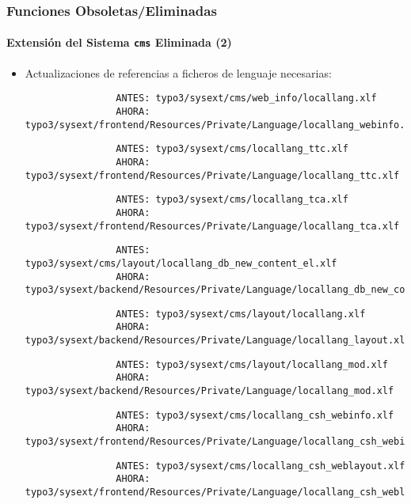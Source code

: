 \begin{frame}[fragile]
	\frametitle{Funciones Obsoletas/Eliminadas}
	\framesubtitle{Extensión del Sistema \texttt{cms} Eliminada (2)}

	\lstset{basicstyle=\tiny\ttfamily}

	\begin{itemize}

		\item Actualizaciones de referencias a ficheros de lenguaje necesarias:


			\begin{lstlisting}
				ANTES: typo3/sysext/cms/web_info/locallang.xlf
				AHORA: typo3/sysext/frontend/Resources/Private/Language/locallang_webinfo.xlf
			\end{lstlisting}
			\vspace{-0.3cm}
			\begin{lstlisting}
				ANTES: typo3/sysext/cms/locallang_ttc.xlf
				AHORA: typo3/sysext/frontend/Resources/Private/Language/locallang_ttc.xlf
			\end{lstlisting}
			\vspace{-0.3cm}
			\begin{lstlisting}
				ANTES: typo3/sysext/cms/locallang_tca.xlf
				AHORA: typo3/sysext/frontend/Resources/Private/Language/locallang_tca.xlf
			\end{lstlisting}
			\vspace{-0.3cm}
			\begin{lstlisting}
				ANTES: typo3/sysext/cms/layout/locallang_db_new_content_el.xlf
				AHORA: typo3/sysext/backend/Resources/Private/Language/locallang_db_new_content_el.xlf
			\end{lstlisting}
			\vspace{-0.3cm}
			\begin{lstlisting}
				ANTES: typo3/sysext/cms/layout/locallang.xlf
				AHORA: typo3/sysext/backend/Resources/Private/Language/locallang_layout.xlf
			\end{lstlisting}
			\vspace{-0.3cm}
			\begin{lstlisting}
				ANTES: typo3/sysext/cms/layout/locallang_mod.xlf
				AHORA: typo3/sysext/backend/Resources/Private/Language/locallang_mod.xlf
			\end{lstlisting}
			\vspace{-0.3cm}
			\begin{lstlisting}
				ANTES: typo3/sysext/cms/locallang_csh_webinfo.xlf
				AHORA: typo3/sysext/frontend/Resources/Private/Language/locallang_csh_webinfo.xlf
			\end{lstlisting}
			\vspace{-0.3cm}
			\begin{lstlisting}
				ANTES: typo3/sysext/cms/locallang_csh_weblayout.xlf
				AHORA: typo3/sysext/frontend/Resources/Private/Language/locallang_csh_weblayout.xlf
			\end{lstlisting}


\end{itemize}
\end{frame}
